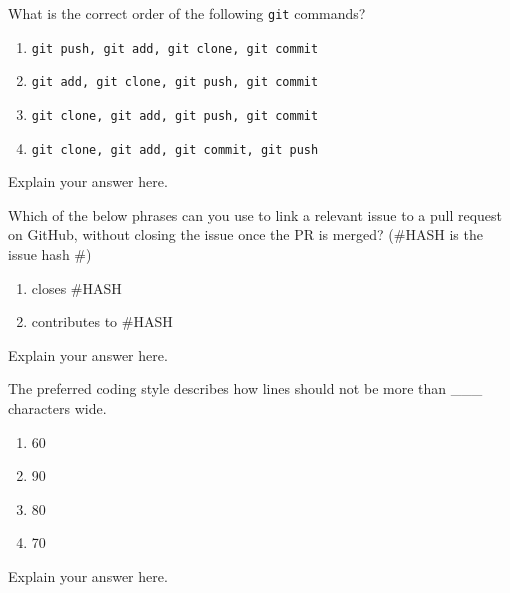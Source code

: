 \documentclass[12pt,fleqn]{examtst}
\begin{document}

\noindent
\begin{minipage}{\textwidth}

What is the correct order of the following \lstinline{git} commands?

\begin{enumerate}
    \item \lstinline{git push, git add, git clone, git commit}
    \item \lstinline{git add, git clone, git push, git commit}
    \item \lstinline{git clone, git add, git push, git commit}
    \item \lstinline{git clone, git add, git commit, git push} \marker
\end{enumerate}
Explain your answer here.

Which of the below phrases can you use to link a relevant issue to a pull request on GitHub, without closing the issue once the PR is merged? (\#HASH is the issue hash \#)

\begin{enumerate}
    \item closes \#HASH
    \item contributes to \#HASH \marker
\end{enumerate}
Explain your answer here.

The preferred coding style describes how lines should not be more than \_\_\_ characters wide.

\begin{enumerate}
    \item 60
    \item 90
    \item 80 \marker
    \item 70
\end{enumerate}
Explain your answer here.

\end{minipage}
\end{document}
